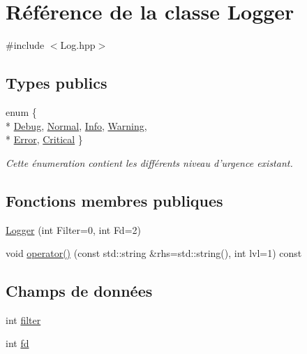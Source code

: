 \hypertarget{structLogger}{\section{Référence de la classe Logger}
\label{structLogger}
}


{\ttfamily \#include $<$Log.\+hpp$>$}

\subsection*{Types publics}
\begin{DoxyCompactItemize}
\item 
enum \{ \\*
\hyperlink{structLogger_a737161d132f5296b6a6a387e702343aca56db48fa2adaf90cde424c8ecfb8e5e1}{Debug}, 
\hyperlink{structLogger_a737161d132f5296b6a6a387e702343acaaf07afd601e9c0e4c30c394462f99159}{Normal}, 
\hyperlink{structLogger_a737161d132f5296b6a6a387e702343aca9f3354efabc848dcb9ddf68279b7417b}{Info}, 
\hyperlink{structLogger_a737161d132f5296b6a6a387e702343aca77a6bb9c2e4acdedd73247b641a61778}{Warning}, 
\\*
\hyperlink{structLogger_a737161d132f5296b6a6a387e702343acaf38b93fc7958d816f1e769f264632e68}{Error}, 
\hyperlink{structLogger_a737161d132f5296b6a6a387e702343aca16f37b00dd31e0c3699a8079fc733930}{Critical}
 \}
\begin{DoxyCompactList}\small\item\em Cette énumeration contient les différents niveau d'urgence existant. \end{DoxyCompactList}\end{DoxyCompactItemize}
\subsection*{Fonctions membres publiques}
\begin{DoxyCompactItemize}
\item 
\hyperlink{structLogger_a3d7fbd0388f4fe493e0ba30a0ef87e7d}{Logger} (int Filter=0, int Fd=2)
\item 
void \hyperlink{structLogger_ac9e1e59987a134104efa32d419fb3a05}{operator()} (const std\+::string \&rhs=std\+::string(), int lvl=1) const 
\end{DoxyCompactItemize}
\subsection*{Champs de données}
\begin{DoxyCompactItemize}
\item 
int \hyperlink{structLogger_ad2ee79af4600bdc5f362c999f86ae718}{filter}
\item 
int \hyperlink{structLogger_aed0c1f4ae52e15c00906b158131a5775}{fd}
\end{DoxyCompactItemize}


